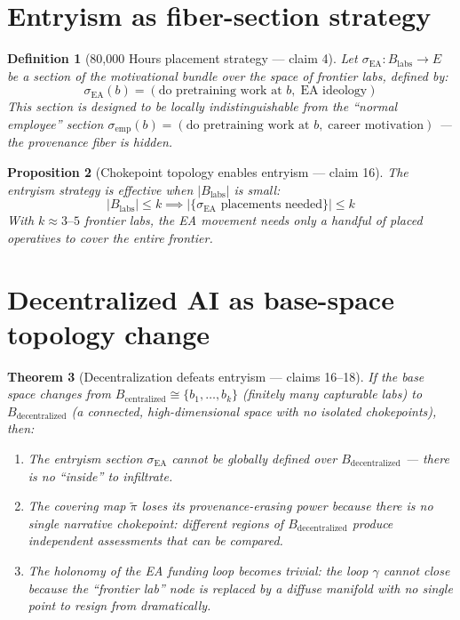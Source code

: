 \documentclass[11pt,a4paper]{article}
\newtheorem{definition}{Definition}[section]
\newtheorem{theorem}[definition]{Theorem}
\newtheorem{proposition}[definition]{Proposition}
\begin{document}
\section{Entryism as fiber-section strategy}
\label{sec:entryism}

\begin{definition}[80,000 Hours placement strategy --- claim 4]
\label{def:entryism}
Let $\sigma_{\text{EA}} : B_{\text{labs}} \to E$ be a section of the
motivational bundle over the space of frontier labs, defined by:
\[
  \sigma_{\text{EA}}(b) = (\text{do pretraining work at } b,\;
                           \text{EA ideology})
\]
This section is designed to be locally indistinguishable from the ``normal
employee'' section $\sigma_{\text{emp}}(b) = (\text{do pretraining work at } b,\;
\text{career motivation})$ --- the provenance fiber is hidden.
\end{definition}

\begin{proposition}[Chokepoint topology enables entryism --- claim 16]
\label{prop:chokepoint}
The entryism strategy is effective when $|B_{\text{labs}}|$ is small:
\[
  |B_{\text{labs}}| \leq k \implies
  |\{\sigma_{\text{EA}} \text{ placements needed}\}| \leq k
\]
With $k \approx 3\text{--}5$ frontier labs, the EA movement needs only a
handful of placed operatives to cover the entire frontier.
\end{proposition}

\section{Decentralized AI as base-space topology change}
\label{sec:decentralization}

\begin{theorem}[Decentralization defeats entryism --- claims 16--18]
\label{thm:decentralization}
If the base space changes from $B_{\text{centralized}} \cong \{b_1, \ldots, b_k\}$
(finitely many capturable labs) to $B_{\text{decentralized}}$ (a connected,
high-dimensional space with no isolated chokepoints), then:
\begin{enumerate}
\item The entryism section $\sigma_{\text{EA}}$ cannot be globally defined
  over $B_{\text{decentralized}}$ --- there is no ``inside'' to infiltrate.
\item The covering map $\tilde{\pi}$ loses its provenance-erasing power because
  there is no single narrative chokepoint: different regions of
  $B_{\text{decentralized}}$ produce independent assessments that can be
  compared.
\item The holonomy of the EA funding loop becomes trivial: the loop
  $\gamma$ cannot close because the ``frontier lab'' node is replaced by
  a diffuse manifold with no single point to resign from dramatically.
\end{enumerate}
\end{theorem}
\end{document}
